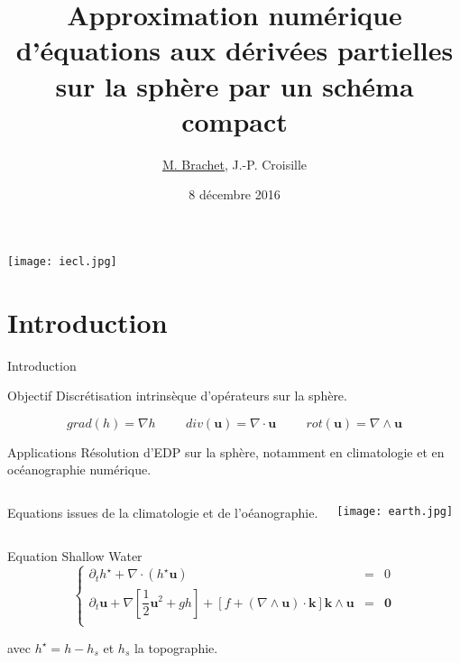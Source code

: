 \documentclass[11pt]{beamer}
\author[Matthieu Brachet]{\underline{M. Brachet}, J.-P. Croisille}
\title[Schémas compacts sur la sphère]{Approximation numérique d'équations aux dérivées partielles sur la sphère par un schéma compact}
\institute[IECL]{Institut Elie Cartan de Lorraine (Metz)}
\date{8 décembre 2016}
\begin{document}
\begin{frame}
\titlepage
\texttt{[image: iecl.jpg]}
\end{frame}

\section*{Introduction}

\begin{frame}{Introduction}
\begin{block}{Objectif}
Discrétisation intrinsèque d'opérateurs sur la sphère.
\end{block}

\begin{equation*}
grad(h) = \nabla h \hspace{1cm} div(\mathbf{u}) = \nabla \cdot \mathbf{u} \hspace{1cm} rot(\mathbf{u}) = \nabla \wedge \mathbf{u}
\end{equation*}

\pause
\begin{block}{Applications}
Résolution d'EDP sur la sphère, notamment en climatologie et en océanographie numérique.
\end{block}

\end{frame}


\begin{frame}

\begin{columns}
Equations issues de la climatologie et de l'oéanographie.

\begin{center}
\texttt{[image: earth.jpg]}
\end{center}

\end{columns}

\pause
\begin{block}{Equation Shallow Water}
\begin{equation}
\left\lbrace
\begin{array}{rcl}
\partial_t h^{\star} + \nabla \cdot \left( h^{\star} \mathbf{u} \right) & = & 0 \\
\partial_t \mathbf{u} + \nabla \left[ \dfrac{1}{2} \mathbf{u}^2 + gh \right] + \left[f + \left( \nabla \wedge \mathbf{u} \right) \cdot \mathbf{k} \right] \mathbf{k} \wedge \mathbf{u} & = & \mathbf{0} \\
\end{array}
\right.
\end{equation}

avec $h^{\star} = h - h_s$ et $h_s$ la topographie.
\end{block}

\end{frame}
\end{document}
